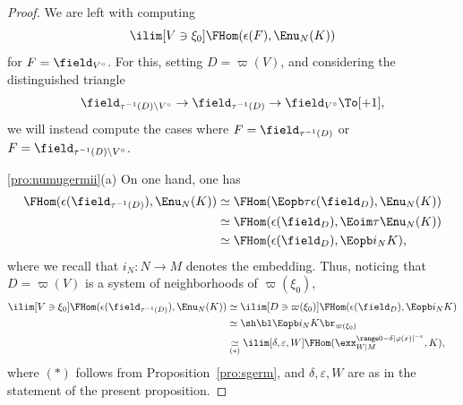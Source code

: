 \begin{proof}
We are left with computing
\[
\ilim[V\owns\xi_0] \FHom(\epsilon(F),\Enu_N(K))
\]
for
$F=\field_{V^\circ}$.
For this, setting $D=\varpi(V)$, and considering the distinguished triangle
\[
\field_{\tau^{-1}(D)\setminus V^\circ} \to
\field_{\tau^{-1}(D)} \to
\field_{V^\circ} \To[+1],
\]
we will instead compute the cases where
$F=\field_{\tau^{-1}(D)}$ or $F=\field_{\tau^{-1}(D)\setminus V^\circ}$.

\eqref{pro:numugermii}(a)
On one hand, one has
\begin{align*}
\FHom(\epsilon(\field_{\tau^{-1}(D)}),\Enu_N(K))
&\simeq \FHom(\Eopb\tau \epsilon(\field_{D}),\Enu_N(K)) \\
&\simeq \FHom(\epsilon(\field_{D}),\Eoim\tau \Enu_N(K)) \\
&\simeq \FHom(\epsilon(\field_{D}),\Eopb i_N K),
\end{align*}
where we recall that $i_N\colon N\to M$ denotes the embedding.
Thus, noticing that $D=\varpi(V)$ is a system of neighborhoods of $\varpi(\xi_0)$,
\begin{align*}
\ilim[V\owns\xi_0] \FHom(\epsilon(\field_{\tau^{-1}(D)}),\Enu_N(K))
&\simeq \ilim[D\owns \varpi(\xi_0)] \FHom(\epsilon(\field_{D}),\Eopb i_N K) \\
&\simeq \sh\bl\Eopb i_N K\br_{\varpi(\xi_0)} \\
&\underset{(*)}\simeq \ilim[\delta,\varepsilon,W]
\FHom( \exx^{\range0{-\delta|\varphi(x)|^{-\varepsilon}}}_{W|M} , K),
\end{align*}
where $(*)$ follows from Proposition~\ref{pro:sgerm}, and $\delta,\varepsilon,W$ are as in the statement of the present proposition.


\end{proof}
